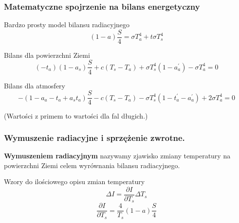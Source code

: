 \documentclass{beamer}
\begin{document}
\begin{frame}
	\frametitle{Matematyczne spojrzenie na bilans energetyczny}
	\begin{block}{Bardzo prosty model bilansu radiacyjnego}
		\[(1-a)\frac{S}{4} = \sigma T_a^4 + t\sigma T_s^4
		\]
	\end{block}
	\begin{block}{Bilans dla powierzchni Ziemi}
		\[(-t_a)(1-a_s)\frac{S}{4}+c(T_s - T_a)+\sigma T_s^4(1-a_a^{'})
		-\sigma T_a^4 =0
		\]
	\end{block}
	\begin{block}{Bilans dla atmosfery}
		\[-(1- a_a-t_a+a_st_a)\frac{S}{4} - c(T_s - T_a) - \sigma T_s^4
		(1-t_a^{'}-a_a^{'}) + 2\sigma T_a^4=0
		\]
	\end{block}
	\scriptsize{(Wartości z primem to wartości dla fal długich.)}
	
\end{frame}


\begin{frame}
	\frametitle{Wymuszenie radiacyjne i sprzężenie zwrotne.}
	\textbf{Wymuszeniem radiacyjnym} nazywamy zjawisko zmiany temperatury na powierzchni Ziemi celem wyrównania bilansu radiacyjnego. 
	\begin{block}{Wzory do ilościowego opisu zmian temperatury}
		\[\Delta I = \frac{\partial I}{\partial T_s}\Delta T_s
		\]
		\[\frac{\partial I}{\partial T_s} = \frac{4}{T_s}(1-a)\frac{S}{4}
		\]
		
	\end{block}
\end{frame}
\end{document}
